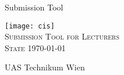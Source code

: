 %
%

\begin{titlepage}
\begin{center}
\vspace*{30mm} \Huge Submission Tool\\
\vspace*{10mm}

\vfill \texttt{[image: cis]}\\
\vspace*{20mm}
\textsc{\LARGE{Submission Tool for Lecturers}\\
\vspace*{5mm}
\large{State \today}}

	
\vfill \small{UAS Technikum Wien}\\

\end{center}
\end{titlepage}

